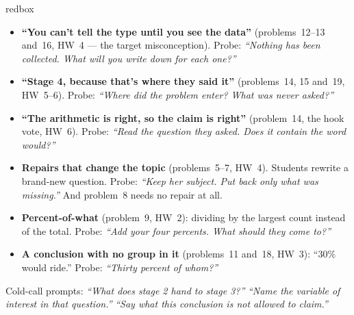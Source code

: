 \documentclass[10pt]{article}
\begin{document}
\boxguard
\begin{skillbox}{redbox}
\begin{itemize}[leftmargin=1.2em, nosep]
  \item \textbf{``You can't tell the type until you see the data''} (problems~12--13 and~16,
        HW~4 --- the target misconception). Probe: \emph{``Nothing has been collected. What
        will you write down for each one?''}
  \item \textbf{``Stage 4, because that's where they said it''} (problems~14, 15 and~19,
        HW~5--6). Probe: \emph{``Where did the problem \emph{enter}? What was never asked?''}
  \item \textbf{``The arithmetic is right, so the claim is right''} (problem~14, the hook
        vote, HW~6). Probe: \emph{``Read the question they asked. Does it contain the word
        \emph{would}?''}
  \item \textbf{Repairs that change the topic} (problems~5--7, HW~4). Students rewrite a
        brand-new question. Probe: \emph{``Keep her subject. Put back only what was
        missing.''} And problem~8 needs no repair at all.
  \item \textbf{Percent-of-what} (problem~9, HW~2): dividing by the largest count instead of
        the total. Probe: \emph{``Add your four percents. What should they come to?''}
  \item \textbf{A conclusion with no group in it} (problems~11 and~18, HW~3): ``$30\%$ would
        ride.'' Probe: \emph{``Thirty percent of whom?''}
\end{itemize}
Cold-call prompts: \emph{``What does stage 2 hand to stage 3?''} \quad \emph{``Name the
variable of interest in that question.''} \quad \emph{``Say what this conclusion is not
allowed to claim.''}
\end{skillbox}
\end{document}
